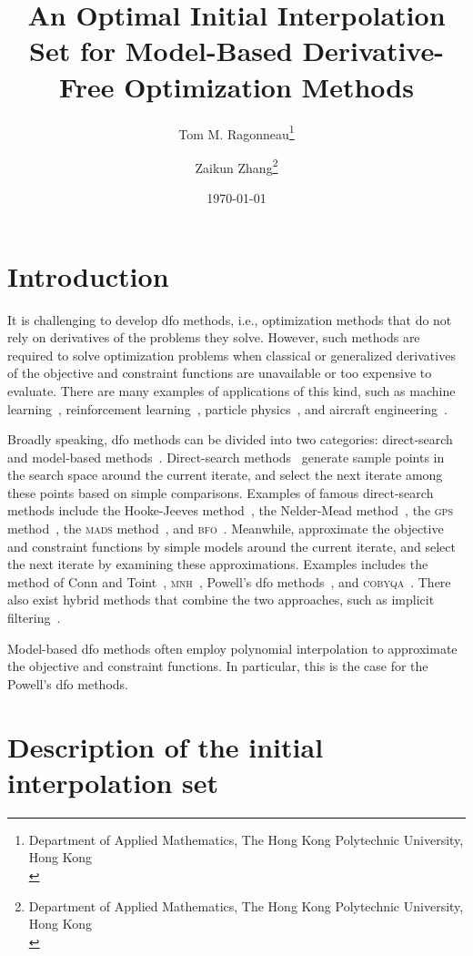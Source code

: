 \documentclass[draft]{article}
\title{An Optimal Initial Interpolation Set for Model-Based Derivative-Free Optimization Methods}
\author{
    Tom M. Ragonneau\thanks{
        Department of Applied Mathematics, The Hong Kong Polytechnic University, Hong Kong\\
        \email{tom.ragonneau@polyu.edu.hk} \quad \website[globe-asia]{www.tomragonneau.com}
    }\orcid{0000-0003-2717-2876} \and
    Zaikun Zhang\thanks{
        Department of Applied Mathematics, The Hong Kong Polytechnic University, Hong Kong\\
        \email{zaikun.zhang@polyu.edu.hk} \quad \website[globe-asia]{www.zhangzk.net}
    }\orcid{0000-0001-8934-8190}
}
\date{\today}
\newcommand{\solvername}[1]{\textsc{#1}\xspace}
\begin{document}
\maketitle

\begin{abstract}
\end{abstract}

\section{Introduction}

It is challenging to develop \gls{dfo} methods, i.e., optimization methods that do not rely on derivatives of the problems they solve.
However, such methods are required to solve optimization problems when classical or generalized derivatives of the objective and constraint functions are unavailable or too expensive to evaluate.
There are many examples of applications of this kind, such as machine learning~\cite{Ghanbari_Scheinberg_2017}, reinforcement learning~\cite{Qian_Yu_2021}, particle physics~\cite{Eldred_Etal_2022}, and aircraft engineering~\cite{Gazaix_Etal_2019}.

Broadly speaking, \gls{dfo} methods can be divided into two categories: direct-search and model-based methods~\cite{Conn_Scheinberg_Vicente_2009}.
Direct-search methods~\cite{Kolda_Lewis_Torczon_2003} generate sample points in the search space around the current iterate, and select the next iterate among these points based on simple comparisons.
Examples of famous direct-search methods include the Hooke-Jeeves method~\cite{Hooke_Jeeves_1961}, the Nelder-Mead method~\cite{Nelder_Mead_1965}, the \solvername{gps} method~\cite{Booker_Etal_1999}, the \solvername{mads} method~\cite{Audet_Dennis_2006}, and \solvername{bfo}~\cite{Porcelli_Toint_2017,Porcelli_Toint_2022}.
Meanwhile,  approximate the objective and constraint functions by simple models around the current iterate, and select the next iterate by examining these approximations.
Examples includes the method of Conn and Toint~\cite{Conn_Toint_1996}, \solvername{mnh}~\cite{Wild_2008}, Powell's \gls{dfo} methods~\cite{Powell_1994,Powell_2002,Powell_2006,Powell_2009}, and \solvername{cobyqa}~\cite{Ragonneau_2022}.
There also exist hybrid methods that combine the two approaches, such as implicit filtering~\cite{Kelley_2011}.

Model-based \gls{dfo} methods often employ polynomial interpolation to approximate the objective and constraint functions.
In particular, this is the case for the Powell's \gls{dfo} methods.

\section{Description of the initial interpolation set}





\listoffixmes
\end{document}
